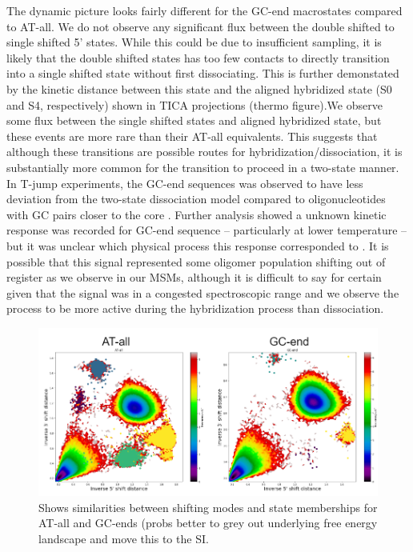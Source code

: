 \documentclass[journal=jpcbfk,manuscript=article]{achemso}
\begin{document}
The dynamic picture looks fairly different for the GC-end macrostates compared to AT-all. We do not observe any significant flux between the double shifted to single shifted 5' states. While this could be due to insufficient sampling, it is likely that the double shifted states has too few contacts to directly transition into a single shifted state without first dissociating. This is further demonstated by the kinetic distance between this state and the aligned hybridized state (S0 and S4, respectively) shown in TICA projections (thermo figure).We observe some flux between the single shifted states and aligned hybridized state, but these events are more rare than their AT-all equivalents. This suggests that although these transitions are possible routes for hybridization/dissociation, it is substantially more common for the transition to proceed in a two-state manner. In T-jump experiments, the GC-end sequences was observed to have less deviation from the two-state dissociation model compared to oligonucleotides with GC pairs closer to the core \citep{Sanstead2016}. Further analysis showed a unknown kinetic response was recorded for GC-end sequence -- particularly at lower temperature -- but it was unclear which physical process this response corresponded to \citep{Sanstead2018DirectDehybridization}. It is possible that this signal represented some oligomer population shifting out of register as we observe in our MSMs, although it is difficult to say for certain given that the signal was in a congested spectroscopic range and we observe the process to be more active during the hybridization process than dissociation.

\begin{figure}[ht!]
	\begin{center}
        \includegraphics[width=\textwidth]{Figs/skeleton/shifting_distribution.PNG}
        \caption{Shows similarities between shifting modes and state memberships for AT-all and GC-ends (probs better to grey out underlying free energy landscape and move this to the SI.}
        \label{fig:shifting_distributions}
	\end{center}
\end{figure}
\end{document}
